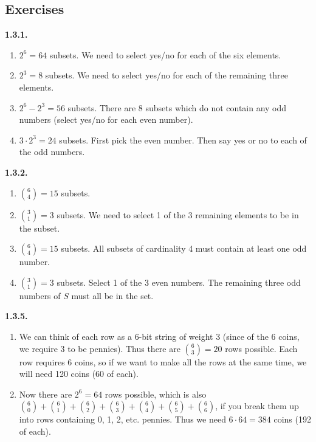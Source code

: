 \documentclass[10pt,]{book}
\theoremstyle{plain}
\theoremstyle{definition}
\theoremstyle{definition}
\theoremstyle{definition}
\theoremstyle{definition}
\numberwithin{equation}{chapter}
\begin{document}
\subsection*{ Exercises}
\noindent\textbf{1.3.1.} \hypertarget{p-840}{}%
\leavevmode%
\begin{enumerate}[label=(\alph*)]
\item\hypertarget{li-384}{}\(2^6 = 64\) subsets. We need to select yes/no for each of the six elements.%
\item\hypertarget{li-385}{}\(2^3 = 8\) subsets.  We need to select yes/no for each of the remaining three elements.%
\item\hypertarget{li-386}{}\(2^6 - 2^3 = 56\) subsets.  There are 8 subsets which do not contain any odd numbers (select yes/no for each even number).%
\item\hypertarget{li-387}{}\(3\cdot 2^3 = 24\) subsets.  First pick the even number.  Then say yes or no to each of the odd numbers.%
\end{enumerate}
%
\par\smallskip
\noindent\textbf{1.3.2.} \hypertarget{p-846}{}%
\leavevmode%
\begin{enumerate}[label=(\alph*)]
\item\hypertarget{li-392}{}\({6\choose 4} = 15\) subsets.%
\item\hypertarget{li-393}{}\({3 \choose 1} = 3\) subsets.  We need to select 1 of the 3 remaining elements to be in the subset.%
\item\hypertarget{li-394}{}\({6 \choose 4} = 15\) subsets.  All subsets of cardinality 4 must contain at least one odd number.%
\item\hypertarget{li-395}{}\({3 \choose 1} = 3\) subsets.  Select 1 of the 3 even numbers.  The remaining three odd numbers of \(S\) must all be in the set.%
\end{enumerate}
%
\par\smallskip
\noindent\textbf{1.3.5.} \hypertarget{p-860}{}%
\leavevmode%
\begin{enumerate}[label=(\alph*)]
\item\hypertarget{li-406}{}\hypertarget{p-861}{}%
We can think of each row as a 6-bit string of weight 3 (since of the 6 coins, we require 3 to be pennies).  Thus there are \({6 \choose 3} = 20\) rows possible.  Each row requires 6 coins, so if we want to make all the rows at the same time, we will need 120 coins (60 of each).%
\item\hypertarget{li-407}{}\hypertarget{p-862}{}%
Now there are \(2^6 = 64\) rows possible, which is also \({6 \choose 0} + {6\choose 1} + {6 \choose 2} + {6 \choose 3} + {6 \choose 4} + {6 \choose 5} + {6 \choose 6}\), if you break them up into rows containing 0, 1, 2, etc. pennies.  Thus we need \(6 \cdot 64 = 384\) coins (192 of each).%
\end{enumerate}
\end{document}

